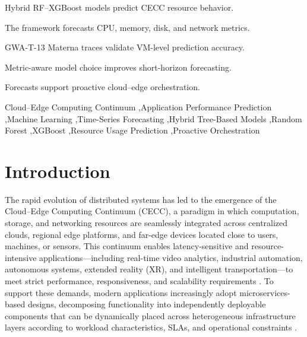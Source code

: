 \documentclass[a4paper,fleqn]{cas-dc}
\begin{document}
\begin{highlights}
\item Hybrid RF--XGBoost models predict CECC resource behavior.
\item The framework forecasts CPU, memory, disk, and network metrics.
\item GWA-T-13 Materna traces validate VM-level prediction accuracy.
\item Metric-aware model choice improves short-horizon forecasting.
\item Forecasts support proactive cloud--edge orchestration.
\end{highlights}

\begin{keywords}
Cloud--Edge Computing Continuum \sep Application Performance Prediction \sep Machine Learning \sep Time-Series Forecasting \sep Hybrid Tree-Based Models \sep Random Forest \sep XGBoost \sep Resource Usage Prediction \sep Proactive Orchestration
\end{keywords}

\maketitle

\section{Introduction}
\label{sec:introduction}

The rapid evolution of distributed systems has led to the emergence of the Cloud--Edge Computing Continuum (CECC), a paradigm in which computation, storage, and networking resources are seamlessly integrated across centralized clouds, regional edge platforms, and far-edge devices located close to users, machines, or sensors. This continuum enables latency-sensitive and resource-intensive applications---including real-time video analytics, industrial automation, autonomous systems, extended reality (XR), and intelligent transportation---to meet strict performance, responsiveness, and scalability requirements \cite{b1,b2}. To support these demands, modern applications increasingly adopt microservices-based designs, decomposing functionality into independently deployable components that can be dynamically placed across heterogeneous infrastructure layers according to workload characteristics, SLAs, and operational constraints \cite{b3}.
\end{document}
